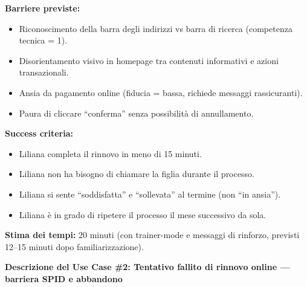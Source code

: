 \documentclass[11pt,a4paper]{article}
\begin{document}
\begin{tcolorbox}[colback=backgroundColor,colframe=borderColor,arc=2mm]
{    \textbf{Barriere previste:}
    \begin{itemize}
        \item Riconoscimento della barra degli indirizzi vs barra di ricerca (competenza tecnica = 1).
        \item Disorientamento visivo in homepage tra contenuti informativi e azioni transazionali.
        \item Ansia da pagamento online (fiducia = bassa, richiede messaggi rassicuranti).
        \item Paura di cliccare ``conferma'' senza possibilità di annullamento.
    \end{itemize}

    \textbf{Success criteria:}
    \begin{itemize}
        \item Liliana completa il rinnovo in meno di 15 minuti.
        \item Liliana non ha bisogno di chiamare la figlia durante il processo.
        \item Liliana si sente ``soddisfatta'' e ``sollevata'' al termine (non ``in ansia'').
        \item Liliana è in grado di ripetere il processo il mese successivo da sola.
    \end{itemize}

    \textbf{Stima dei tempi:} 20 minuti (con trainer-mode e messaggi di rinforzo, previsti 12--15 minuti dopo familiarizzazione).
    }
\end{tcolorbox}

\newpage


\begin{tcolorbox}[colback=primaryColor!10,colframe=primaryColor,arc=2mm]
    \textbf{Descrizione del Use Case \#2: Tentativo fallito di rinnovo online --- barriera SPID e abbandono}
\end{tcolorbox}

\vspace{0.3cm}
\end{document}
